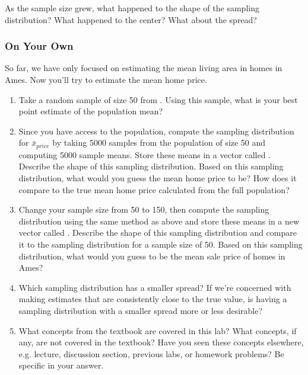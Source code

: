 \documentclass[11pt]{article}
\begin{document}
\begin{exercise}
As the sample size grew, what happened to the shape of the sampling distribution?  What happened to the center?  What about the spread?
\end{exercise}

\vfill

\subsubsection*{On Your Own}
So far, we have only focused on estimating the mean living area in homes in Ames.  Now you'll try to estimate the mean home price.
\begin{enumerate}
\item Take a random sample of size 50 from \texttt{}. Using this sample, what is your best point estimate of the population mean?
\item Since you have access to the population, compute the sampling distribution for $\bar{x}_{price}$ by taking 5000 samples from the population of size 50 and computing 5000 sample means.  Store these means in a vector called \texttt{}. Describe the shape of this sampling distribution. Based on this sampling distribution, what would you guess the mean home price to be?  How does it compare to the true mean home price calculated from the full population?
\item Change your sample size from 50 to 150, then compute the sampling distribution using the same method as above and store these means in a new vector called \texttt{}. Describe the shape of this sampling distribution and compare it to the sampling distribution for a sample size of 50.  Based on this sampling distribution, what would you guess to be the mean sale price of homes in Ames?
\item Which sampling distribution has a smaller spread?  If we're concerned with making estimates that are consistently close to the true value, is having a sampling distribution with a smaller spread more or less desirable?
\item What concepts from the textbook are covered in this lab?  What concepts, if any, are not covered in the textbook?  Have you seen these concepts elsewhere, e.g. lecture, discussion section, previous labs, or homework problems?  Be specific in your answer.

\vfill

\end{enumerate}
\end{document}
